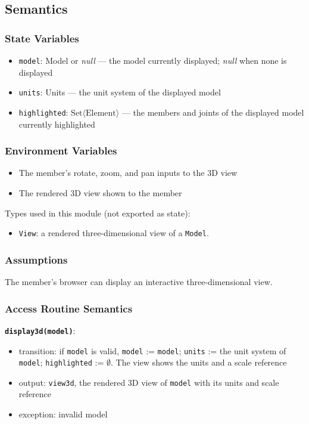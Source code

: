 \documentclass[12pt, titlepage]{article}
\begin{document}
\subsection{Semantics}

\subsubsection{State Variables}
\begin{itemize}
  \item \texttt{model}: Model or \textit{null} --- the model currently displayed; \textit{null} when none is displayed
  \item \texttt{units}: Units --- the unit system of the displayed model
  \item \texttt{highlighted}: $\text{Set}\langle \text{Element} \rangle$ --- the members and joints of the displayed model currently highlighted
\end{itemize}

\subsubsection{Environment Variables}
\begin{itemize}
  \item The member's rotate, zoom, and pan inputs to the 3D view
  \item The rendered 3D view shown to the member
\end{itemize}

Types used in this module (not exported as state):
\begin{itemize}
  \item \texttt{View}: a rendered three-dimensional view of a \texttt{Model}.
\end{itemize}

\subsubsection{Assumptions}
The member's browser can display an interactive three-dimensional view.

\subsubsection{Access Routine Semantics}

\textbf{\texttt{display3d(model)}}:
\begin{itemize}
  \item transition: if \texttt{model} is valid, \texttt{model} := \texttt{model}; \texttt{units} := the unit system of \texttt{model}; \texttt{highlighted} := $\emptyset$. The view shows the units and a scale reference
  \item output: \texttt{view3d}, the rendered 3D view of \texttt{model} with its units and scale reference
  \item exception: invalid model
\end{itemize}
\end{document}
